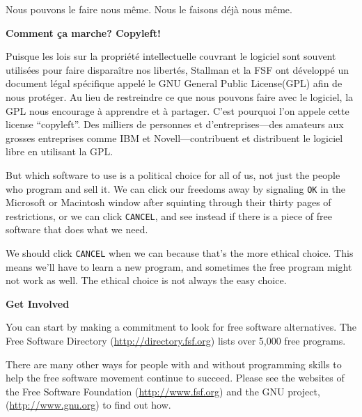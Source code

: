 \documentclass[twoside,12pt]{article}
\begin{document}
Nous pouvons le faire nous même. Nous le faisons déjà nous même.

\begin{center}
{\Large\bf Comment ça marche? Copyleft!}
\end{center}

Puisque les lois sur la propriété intellectuelle couvrant le logiciel sont
souvent utilisées pour faire disparaître nos libertés, Stallman et la FSF ont
développé un document légal spécifique appelé le GNU General Public License(GPL)
afin de nous protéger. Au lieu de restreindre ce que nous pouvons faire avec le
logiciel, la GPL nous encourage à apprendre et à partager. C'est pourquoi l'on
appele cette license ``copyleft''. Des milliers de personnes et
d'entreprises---des amateurs aux grosses entreprises comme IBM et
Novell---contribuent et distribuent le logiciel libre en utilisant la GPL.


But which software to use is a political choice for all of us, not just the
people who program and sell it. We can click our freedoms away by signaling
{\tt OK} in the Microsoft or Macintosh window after squinting through their
thirty pages of restrictions, or we can click {\tt CANCEL}, and see instead if
there is a piece of free software that does what we need.

We should click {\tt CANCEL} when we can because that's the more ethical choice.
This means we'll have to learn a new program, and sometimes the free program
might not work as well. The ethical choice is not always the easy choice.

\begin{center}
{\Large\bf Get Involved}
\end{center}

You can start by making a commitment to look for free software alternatives.
The Free Software Directory (\url{http://directory.fsf.org}) lists over 5,000 free
programs.

There are many other ways for people with and without programming skills to
help the free software movement continue to succeed. Please see the websites of
the Free Software Foundation (\url{http://www.fsf.org}) and the GNU project,
(\url{http://www.gnu.org}) to find out how.
\end{document}
